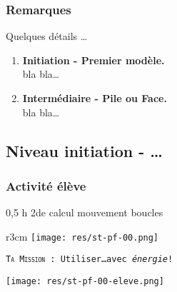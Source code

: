 \subsubsection{Remarques}


\begin{methode}
    Quelques détails
    \ldots %

    \begin{enumerate}
        \item \textbf{Initiation - Premier modèle.} \\
            bla bla\ldots %
        \item \textbf{Intermédiaire - Pile ou Face.}\\
            bla bla\ldots %
    \end{enumerate}
\end{methode}

%
%

\newpage

\subsection{Niveau initiation - \ldots}

\subsubsection{Activité élève}

\cartouche
{0,5 h}         %
{2de}           %
{calcul}        %
{mouvement}     %
{boucles}       %


\begin{wrapfigure}[4]{r}{3cm}
    \texttt{[image: res/st-pf-00.png]}
\end{wrapfigure}

\begin{eleve}
    \texttt{\textsc{Ta Mission} : Utiliser\ldots avec \emph{énergie}!}

    \texttt{[image: res/st-pf-00-eleve.png]}
\end{eleve}



